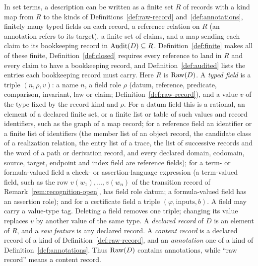 In set terms, a description can be written as a finite set \(R\) of records
with a kind map from \(R\) to the kinds of Definitions~\ref{def:raw-record}
and~\ref{def:annotations}, finitely many typed fields on each record, a
reference relation on \(R\) (an annotation refers to its target), a finite
set of claims, and a map sending each claim to its bookkeeping record in
\(\operatorname{Audit}\!\left(D\right)\subseteq R\). Definition~\ref{def:finite} makes all of these
finite, Definition~\ref{def:closed} requires every reference to land in
\(R\) and every claim to have a bookkeeping record, and
Definition~\ref{def:audited} lists the entries each bookkeeping record must
carry. Here \(R\) is \(\operatorname{Raw}\!\left(D\right)\). A \emph{typed field} is a triple \((n,\rho,v)\): a
name \(n\), a field role \(\rho\) (datum, reference, predicate, comparison,
invariant, law or claim; Definition~\ref{def:raw-record}), and a value \(v\) of
the type fixed by the record kind and \(\rho\). For a datum field this is a
rational, an element of a declared finite set, or a finite list or table of
such values and record identifiers, such as the graph of a map record; for a
reference field an identifier or a finite list of identifiers (the member
list of an object record, the candidate class of a realization relation, the
entry list of a trace, the list of successive records and the word of a path
or derivation record, and
every declared domain, codomain, source, target, endpoint and index field are
reference fields); for a term- or
formula-valued field a check- or assertion-language expression (a term-valued field, such as the row
\(v(w_1),\dots,v(w_n)\) of the transition record of Remark~\ref{rem:recognition-open}, has
field role datum; a formula-valued field has an assertion role); and for a
certificate field a triple \((\varphi,\text{inputs},b)\). A field may carry a
value-type tag. Deleting a field removes one triple; changing its value
replaces \(v\) by another value of the same type. A \emph{declared record} of \(D\) is an
element of \(R\), and a \emph{raw feature} is any declared record. A
\emph{content record} is a declared record of a kind of
Definition~\ref{def:raw-record}, and an \emph{annotation} one of a kind of
Definition~\ref{def:annotations}. Thus \(\operatorname{Raw}\!\left(D\right)\) contains annotations, while
``raw record'' means a content record.

